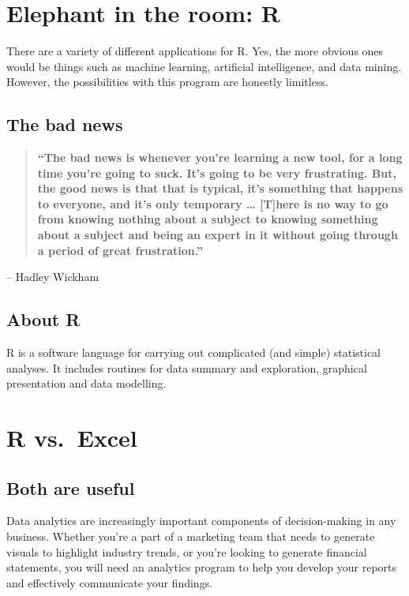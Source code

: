 \documentclass[
]{book}
\begin{document}
\hypertarget{elephant-in-the-room-r}{%
\chapter{\texorpdfstring{Elephant in the room: \textbf{R}}{Elephant in the room: R}}\label{elephant-in-the-room-r}}

There are a variety of different applications for R. Yes, the more obvious ones would be things such as machine learning, artificial intelligence, and data mining. However, the possibilities with this program are honestly limitless.

\hypertarget{the-bad-news}{%
\section{The bad news}\label{the-bad-news}}

\begin{quote}
\textbf{``The bad news is whenever you're learning a new tool, for a long time you're going to suck. It's going to be very frustrating. But, the good news is that that is typical, it's something that happens to everyone, and it's only temporary \ldots{} {[}T{]}here is no way to go from knowing nothing about a subject to knowing something about a subject and being an expert in it without going through a period of great frustration.''}
\end{quote}

-- Hadley Wickham

\hypertarget{about-r}{%
\section{About R}\label{about-r}}

R is a software language for carrying out complicated (and simple) statistical analyses. It includes routines for data summary and exploration, graphical presentation and data modelling.

\hypertarget{r-vs.-excel}{%
\chapter{R vs.~Excel}\label{r-vs.-excel}}

\hypertarget{both-are-useful}{%
\section{Both are useful}\label{both-are-useful}}

Data analytics are increasingly important components of decision-making in any business. Whether you're a part of a marketing team that needs to generate visuals to highlight industry trends, or you're looking to generate financial statements, you will need an analytics program to help you develop your reports and effectively communicate your findings.
\end{document}
